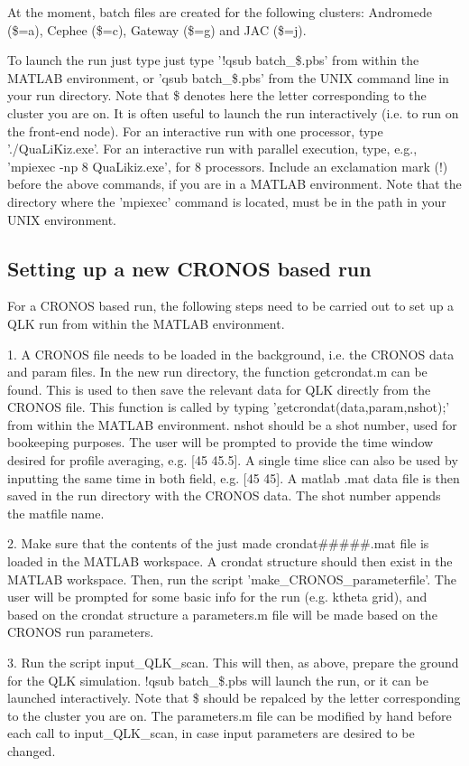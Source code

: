 \documentclass{article}
\begin{document}
At the moment, batch files are created for the following clusters: Andromede (\$=a), Cephee (\$=c), Gateway (\$=g) and JAC (\$=j). 

To launch the run just type just type '!qsub batch\_\$.pbs' from within the MATLAB environment, or 'qsub batch\_\$.pbs' from the UNIX command line in your run directory. Note that \$ denotes here the letter corresponding to the cluster you are on. It is often useful to launch the run interactively (i.e. to run on the front-end node). For an interactive run with one processor, type './QuaLiKiz.exe'. For an interactive run with parallel execution, type, e.g., 'mpiexec -np 8 QuaLikiz.exe', for 8 processors. Include an exclamation mark (!) before the above commands, if you are in a MATLAB environment. Note that the directory where the 'mpiexec' command is located, must be in the path in your UNIX environment.

\subsection{Setting up a new CRONOS based run}

For a CRONOS based run, the following steps need to be carried out to set up a QLK run from within the MATLAB environment.

1. A CRONOS file needs to be loaded in the background, i.e. the CRONOS data and param files. In the new run directory, the function 
getcrondat.m can be found. This is used to then save the relevant data for QLK directly from the CRONOS file. This function is called 
by typing 'getcrondat(data,param,nshot);' from within the MATLAB environment. nshot should be a shot number, used for bookeeping 
purposes. The user will be prompted to provide the time window desired for profile averaging, e.g. [45 45.5]. A single time slice 
can also be used by inputting the same time in both field, e.g. [45 45]. A matlab .mat data file is then saved in the run directory 
with the CRONOS data. The shot number appends the matfile name.

2. Make sure that the contents of the just made crondat\#\#\#\#\#.mat file is loaded in the MATLAB workspace. A crondat structure should then exist in the MATLAB workspace. Then, run the script 'make\_CRONOS\_parameterfile'. The user will be prompted for
some basic info for the run (e.g. ktheta grid), and based on the crondat structure a parameters.m file will be made based on the CRONOS run parameters. 

3. Run the script input\_QLK\_scan. This will then, as above, prepare the ground for the QLK simulation. !qsub batch\_\$.pbs will launch the run, or it can be launched interactively. Note that \$ should be repalced by the letter corresponding to the cluster you are on.
The parameters.m file can be modified by hand before each call to input\_QLK\_scan, in case input parameters are desired to be changed.
\end{document}
